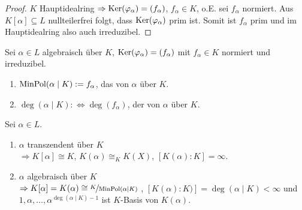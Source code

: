 \begin{proof}
	$K$ Hauptidealring $\Rightarrow \operatorname{Ker}(\varphi_\alpha) = (f_\alpha)$, $f_\alpha \in K$, o.E. sei $f_{\alpha}$ normiert. Aus $K[\alpha] \subseteq L$ nullteilerfrei folgt, dass $\operatorname{Ker}(\varphi_\alpha)$ prim ist. Somit ist $f_\alpha$ prim und im Hauptidealring also auch irreduzibel.
\end{proof}

\begin{definition}
	Sei $\alpha \in L$ algebraisch über $K$, $\operatorname{Ker}(\varphi_\alpha) = (f_\alpha)$ mit $f_\alpha \in K$ normiert und irreduzibel.
	\begin{enumerate}[label=(\alph*)]
		\item $\operatorname{MinPol}(\alpha\mid K) := f_\alpha$, das  von $\alpha$ über $K$.
		\item $\deg(\alpha\mid K) :\Leftrightarrow \deg(f_\alpha)$, der  von $\alpha$ über $K$.
	\end{enumerate}
\end{definition}

\begin{proposition}
	Sei $\alpha \in L$.
	\begin{enumerate}[label=(\alph*)]
		\item $\alpha$ transzendent über $K$ \\
		$\Rightarrow K[\alpha] \cong K$, $K(\alpha) \cong_K K(X)$, $[K(\alpha) : K] = \infty$.
		\item $\alpha$ algebraisch über $K$ \\
		$\Rightarrow K[\alpha] = K(\alpha) \cong \lnkset{K}{\MinPol(\alpha\mid K)}$ , $[ K(\alpha) \colon K)]  = \deg(\alpha \mid K) < \infty$ und \\
		$1, \alpha, \dots , \alpha^{\deg(\alpha \mid K) -1}$ ist $K$-Basis von $K(\alpha)$. 
	\end{enumerate}
\end{proposition}


